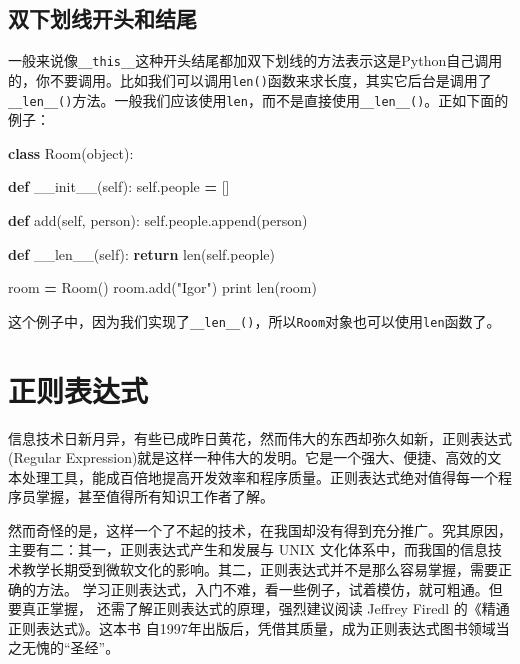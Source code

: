 \documentclass[]{ctexbook}
\newenvironment{Shaded}{\begin{snugshade}}{\end{snugshade}}
\newcommand{\BuiltInTok}[1]{#1}
\newcommand{\ControlFlowTok}[1]{\textcolor[rgb]{0.13,0.29,0.53}{\textbf{#1}}}
\newcommand{\FunctionTok}[1]{\textcolor[rgb]{0.00,0.00,0.00}{#1}}
\newcommand{\KeywordTok}[1]{\textcolor[rgb]{0.13,0.29,0.53}{\textbf{#1}}}
\newcommand{\NormalTok}[1]{#1}
\newcommand{\OperatorTok}[1]{\textcolor[rgb]{0.81,0.36,0.00}{\textbf{#1}}}
\newcommand{\StringTok}[1]{\textcolor[rgb]{0.31,0.60,0.02}{#1}}
\newcommand{\VariableTok}[1]{\textcolor[rgb]{0.00,0.00,0.00}{#1}}
\begin{document}
\hypertarget{ux53ccux4e0bux5212ux7ebfux5f00ux5934ux548cux7ed3ux5c3e}{%
\section{双下划线开头和结尾}\label{ux53ccux4e0bux5212ux7ebfux5f00ux5934ux548cux7ed3ux5c3e}}

一般来说像\texttt{\_\_this\_\_}这种开头结尾都加双下划线的方法表示这是Python自己调用的，你不要调用。比如我们可以调用\texttt{len()}函数来求长度，其实它后台是调用了\texttt{\_\_len\_\_()}方法。一般我们应该使用\texttt{len}，而不是直接使用\texttt{\_\_len\_\_()}。正如下面的例子：

\begin{Shaded}
\begin{Highlighting}[]
\KeywordTok{class}\NormalTok{ Room(}\BuiltInTok{object}\NormalTok{):}

    \KeywordTok{def} \FunctionTok{__init__}\NormalTok{(}\VariableTok{self}\NormalTok{):}
        \VariableTok{self}\NormalTok{.people }\OperatorTok{=}\NormalTok{ []}

    \KeywordTok{def}\NormalTok{ add(}\VariableTok{self}\NormalTok{, person):}
        \VariableTok{self}\NormalTok{.people.append(person)}

    \KeywordTok{def} \FunctionTok{__len__}\NormalTok{(}\VariableTok{self}\NormalTok{):}
        \ControlFlowTok{return} \BuiltInTok{len}\NormalTok{(}\VariableTok{self}\NormalTok{.people)}

\NormalTok{room }\OperatorTok{=}\NormalTok{ Room()}
\NormalTok{room.add(}\StringTok{"Igor"}\NormalTok{)}
\BuiltInTok{print} \BuiltInTok{len}\NormalTok{(room)}
\end{Highlighting}
\end{Shaded}

这个例子中，因为我们实现了\texttt{\_\_len\_\_()}，所以\texttt{Room}对象也可以使用\texttt{len}函数了。

\hypertarget{re}{%
\chapter{正则表达式}\label{re}}

信息技术日新月异，有些已成昨日黄花，然而伟大的东西却弥久如新，正则表达式(Regular Expression)就是这样一种伟大的发明。它是一个强大、便捷、高效的文本处理工具，能成百倍地提高开发效率和程序质量。正则表达式绝对值得每一个程序员掌握，甚至值得所有知识工作者了解。

然而奇怪的是，这样一个了不起的技术，在我国却没有得到充分推广。究其原因，主要有二：其一，正则表达式产生和发展与 UNIX 文化体系中，而我国的信息技术教学长期受到微软文化的影响。其二，正则表达式并不是那么容易掌握，需要正确的方法。
学习正则表达式，入门不难，看一些例子，试着模仿，就可粗通。但要真正掌握， 还需了解正则表达式的原理，强烈建议阅读 Jeffrey Firedl 的《精通正则表达式》。这本书 自1997年出版后，凭借其质量，成为正则表达式图书领域当之无愧的``圣经''。
\end{document}
